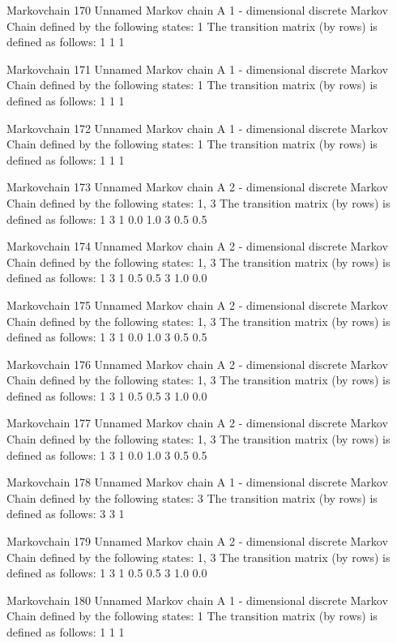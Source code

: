 \documentclass[
  nojss]{jss}
\begin{document}
\begin{CodeChunk}
\begin{CodeOutput}
Markovchain  170 
Unnamed Markov chain 
 A  1 - dimensional discrete Markov Chain defined by the following states: 
 1 
 The transition matrix  (by rows)  is defined as follows: 
  1
1 1

Markovchain  171 
Unnamed Markov chain 
 A  1 - dimensional discrete Markov Chain defined by the following states: 
 1 
 The transition matrix  (by rows)  is defined as follows: 
  1
1 1

Markovchain  172 
Unnamed Markov chain 
 A  1 - dimensional discrete Markov Chain defined by the following states: 
 1 
 The transition matrix  (by rows)  is defined as follows: 
  1
1 1

Markovchain  173 
Unnamed Markov chain 
 A  2 - dimensional discrete Markov Chain defined by the following states: 
 1, 3 
 The transition matrix  (by rows)  is defined as follows: 
    1   3
1 0.0 1.0
3 0.5 0.5

Markovchain  174 
Unnamed Markov chain 
 A  2 - dimensional discrete Markov Chain defined by the following states: 
 1, 3 
 The transition matrix  (by rows)  is defined as follows: 
    1   3
1 0.5 0.5
3 1.0 0.0

Markovchain  175 
Unnamed Markov chain 
 A  2 - dimensional discrete Markov Chain defined by the following states: 
 1, 3 
 The transition matrix  (by rows)  is defined as follows: 
    1   3
1 0.0 1.0
3 0.5 0.5

Markovchain  176 
Unnamed Markov chain 
 A  2 - dimensional discrete Markov Chain defined by the following states: 
 1, 3 
 The transition matrix  (by rows)  is defined as follows: 
    1   3
1 0.5 0.5
3 1.0 0.0

Markovchain  177 
Unnamed Markov chain 
 A  2 - dimensional discrete Markov Chain defined by the following states: 
 1, 3 
 The transition matrix  (by rows)  is defined as follows: 
    1   3
1 0.0 1.0
3 0.5 0.5

Markovchain  178 
Unnamed Markov chain 
 A  1 - dimensional discrete Markov Chain defined by the following states: 
 3 
 The transition matrix  (by rows)  is defined as follows: 
  3
3 1

Markovchain  179 
Unnamed Markov chain 
 A  2 - dimensional discrete Markov Chain defined by the following states: 
 1, 3 
 The transition matrix  (by rows)  is defined as follows: 
    1   3
1 0.5 0.5
3 1.0 0.0

Markovchain  180 
Unnamed Markov chain 
 A  1 - dimensional discrete Markov Chain defined by the following states: 
 1 
 The transition matrix  (by rows)  is defined as follows: 
  1
1 1


\end{CodeOutput}
\end{CodeChunk}
\end{document}
